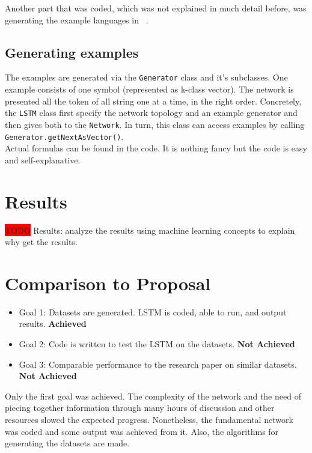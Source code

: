 \documentclass[11pt,letterpaper]{article}
\begin{document}
Another part that was coded, which was not explained in much detail before, was generating the example languages in ~\cite{Gers:01}.

\subsection{Generating examples}
The examples are generated via the \verb!Generator! class and it's subclasses. One example consists of one symbol (represented as k-class vector). The network is presented all the token of all string one at a time, in the right order. Concretely, the \verb!LSTM! class first specify the network topology and an example generator and then gives both to the \verb!Network!. In turn, this class can access examples by calling \verb!Generator.getNextAsVector()!.\\

Actual formulas can be found in the code. It is nothing fancy but the code is easy and self-explanative.

\section{Results}
\colorbox{red}{TODO}
Results: analyze the results using machine learning concepts to explain why get the results.

\section{Comparison to Proposal}
\begin{itemize}
	\item Goal 1: Datasets are generated. LSTM is coded, able to run, and output results. \textbf{Achieved}
	\item Goal 2: Code is written to test the LSTM on the datasets. \textbf{Not Achieved}
	\item Goal 3: Comparable performance to the research paper on similar datasets. \textbf{Not Achieved}
\end{itemize}

Only the first goal was achieved. The complexity of the network and the need of piecing together information through many hours of discussion and other resources slowed the expected progress. Nonetheless, the fundamental network was coded and some output was achieved from it. Also, the algorithms for generating the datasets are made. 
\end{document}
